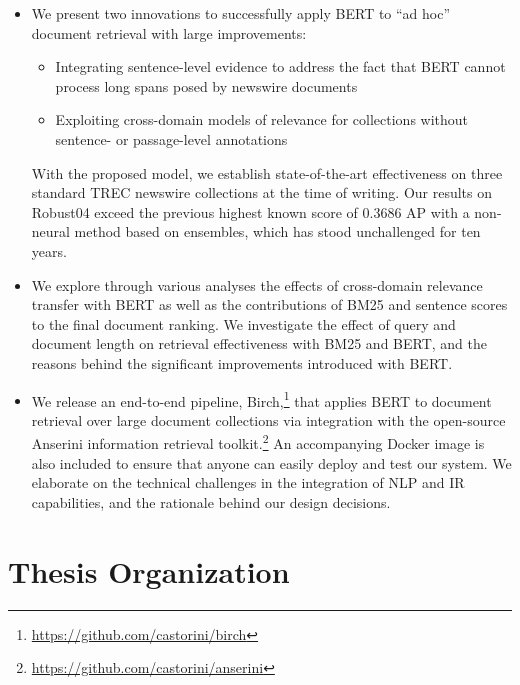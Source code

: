 \begin{itemize}
	\item
	We present two innovations to successfully apply BERT to ``ad hoc'' document retrieval 	with large improvements:\
	\begin{itemize}
		\item Integrating sentence-level evidence to address the fact that BERT cannot process long spans posed by newswire documents
		\item Exploiting cross-domain models of relevance for collections without sentence- or passage-level annotations
	\end{itemize}
	With the proposed model, we establish state-of-the-art effectiveness on three standard TREC newswire collections at the time of writing.
	Our results on Robust04 exceed the previous highest known score of 0.3686 AP \cite{Cormack:2009:RRF:1571941.1572114} with a non-neural method based on ensembles, which has stood unchallenged for ten years.

	\item
	We explore through various analyses the effects of cross-domain relevance transfer with BERT as well as the contributions of BM25 and sentence scores to the final document ranking.
	We investigate the effect of query and document length on retrieval effectiveness with BM25 and BERT, and the reasons behind the significant improvements introduced with BERT.

	\item
	We release an end-to-end pipeline, Birch,\footnote{\url{https://github.com/castorini/birch}} that applies BERT to document retrieval over large document collections via integration with the open-source Anserini information retrieval toolkit.\footnote{\url{https://github.com/castorini/anserini}}
	An accompanying Docker image is also included to ensure that anyone can easily deploy and test our system.
	We elaborate on the technical challenges in the integration of NLP and IR capabilities, and the rationale behind our design decisions.
\end{itemize}

\newpage

\section{Thesis Organization}

